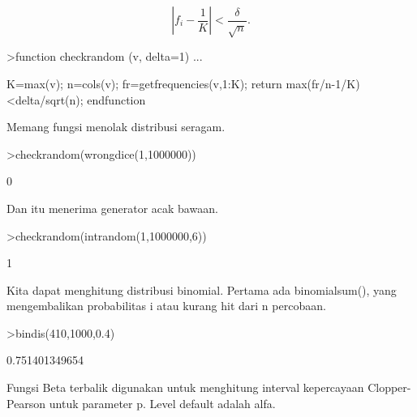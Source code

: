 \documentclass[a4paper,10pt]{article}
\begin{document}
\begin{eulernotebook}
\begin{eulercomment}
\begin{eulercomment}
\begin{eulercomment}
\begin{eulercomment}
\begin{eulercomment}
\begin{eulercomment}
\begin{eulercomment}
\begin{eulercomment}
\begin{eulercomment}
\begin{eulercomment}
\begin{eulercomment}
\begin{eulercomment}
\begin{eulercomment}
\begin{eulercomment}
\begin{eulercomment}
\begin{eulercomment}
\begin{eulercomment}
\begin{eulercomment}
\begin{eulercomment}
\end{eulercomment}
\begin{eulerformula}
\[
\left|f_i-\frac{1}{K}\right| < \frac{\delta}{\sqrt{n}}.
\]
\end{eulerformula}
\begin{eulerprompt}
>function checkrandom (v, delta=1) ...
\end{eulerprompt}
\begin{eulerudf}
    K=max(v); n=cols(v);
    fr=getfrequencies(v,1:K);
    return max(fr/n-1/K)<delta/sqrt(n);
    endfunction
\end{eulerudf}
\begin{eulercomment}
Memang fungsi menolak distribusi seragam.
\end{eulercomment}
\begin{eulerprompt}
>checkrandom(wrongdice(1,1000000))
\end{eulerprompt}
\begin{euleroutput}
  0
\end{euleroutput}
\begin{eulercomment}
Dan itu menerima generator acak bawaan.
\end{eulercomment}
\begin{eulerprompt}
>checkrandom(intrandom(1,1000000,6))
\end{eulerprompt}
\begin{euleroutput}
  1
\end{euleroutput}
\begin{eulercomment}
Kita dapat menghitung distribusi binomial. Pertama ada binomialsum(),
yang mengembalikan probabilitas i atau kurang hit dari n percobaan.
\end{eulercomment}
\begin{eulerprompt}
>bindis(410,1000,0.4)
\end{eulerprompt}
\begin{euleroutput}
  0.751401349654
\end{euleroutput}
\begin{eulercomment}
Fungsi Beta terbalik digunakan untuk menghitung interval kepercayaan
Clopper-Pearson untuk parameter p. Level default adalah alfa.


\end{eulercomment}
\end{eulercomment}
\end{eulercomment}
\end{eulercomment}
\end{eulercomment}
\end{eulercomment}
\end{eulercomment}
\end{eulercomment}
\end{eulercomment}
\end{eulercomment}
\end{eulercomment}
\end{eulercomment}
\end{eulercomment}
\end{eulercomment}
\end{eulercomment}
\end{eulercomment}
\end{eulercomment}
\end{eulercomment}
\end{eulercomment}
\end{eulernotebook}
\end{document}
